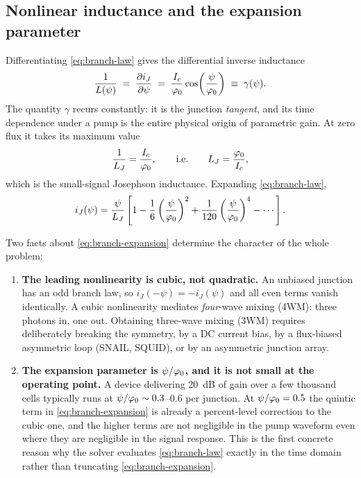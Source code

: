 \subsection{Nonlinear inductance and the expansion parameter}

Differentiating \eqref{eq:branch-law} gives the differential inverse inductance
\begin{equation}
  \frac{1}{L(\psi)}
  \;=\;
  \frac{\partial i_J}{\partial \psi}
  \;=\;
  \frac{I_c}{\varphi_{0}}\cos\!\left(\frac{\psi}{\varphi_{0}}\right)
  \;\equiv\;
  \gamma(\psi).
  \label{eq:gamma-def}
\end{equation}
The quantity $\gamma$ recurs constantly: it is the junction \emph{tangent}, and
its time dependence under a pump is the entire physical origin of parametric
gain. At zero flux it takes its maximum value
\begin{equation}
  \frac{1}{L_J} = \frac{I_c}{\varphi_{0}},
  \qquad\text{i.e.}\qquad
  L_J = \frac{\varphi_{0}}{I_c},
\end{equation}
which is the small-signal Josephson inductance. Expanding
\eqref{eq:branch-law},
\begin{equation}
  i_J(\psi) = \frac{\psi}{L_J}
  \left[
    1 - \frac{1}{6}\left(\frac{\psi}{\varphi_{0}}\right)^{2}
      + \frac{1}{120}\left(\frac{\psi}{\varphi_{0}}\right)^{4}
      - \cdots
  \right].
  \label{eq:branch-expansion}
\end{equation}

Two facts about \eqref{eq:branch-expansion} determine the character of the whole
problem:

\begin{enumerate}
\item \textbf{The leading nonlinearity is cubic, not quadratic.} An unbiased
      junction has an odd branch law, so $i_J(-\psi)=-i_J(\psi)$ and all even
      terms vanish identically. A cubic nonlinearity mediates
      \emph{four}-wave mixing (4WM): three photons in, one out. Obtaining
      three-wave mixing (3WM) requires deliberately breaking the symmetry, by
      a DC current bias, by a flux-biased asymmetric loop (SNAIL, SQUID), or
      by an asymmetric junction array.

\item \textbf{The expansion parameter is $\psi/\varphi_{0}$, and it is not small at
      the operating point.} A device delivering \SI{20}{\dB} of gain over a
      few thousand cells typically runs at $\psi/\varphi_{0} \sim 0.3$--$0.6$ per
      junction. At $\psi/\varphi_{0} = 0.5$ the quintic term in
      \eqref{eq:branch-expansion} is already a percent-level correction to the
      cubic one, and the higher terms are not negligible in the pump waveform
      even where they are negligible in the signal response. This is the first
      concrete reason why the solver evaluates \eqref{eq:branch-law} exactly in
      the time domain rather than truncating \eqref{eq:branch-expansion}.
\end{enumerate}

